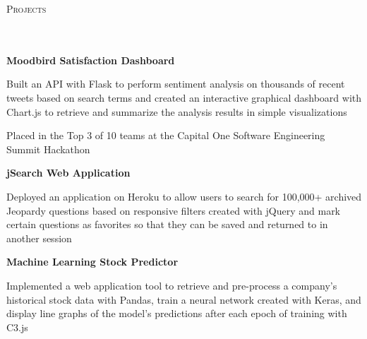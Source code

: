 \documentclass{article}
\newcommand{\header}[1]{{
\hspace*{-15pt}\vspace*{6pt} \large \scshape{#1}} \vspace*{-6pt} 
\lineunder
}
\newcommand{\lineunder}{
\vspace*{-8pt} \\ \hspace*{-18pt} 
\hrulefill \\
}
\newcommand{\project}[4]{{
\vspace*{2pt}%
\textbf{#1} #2 \hfill #3\\ #4 \vspace*{2pt}}
}
\renewcommand{\labelitemii}{
$\vcenter{\hbox{\tiny$\bullet$}}$\hspace*{-3pt}
}
\newenvironment{bullet-list-minor}{
\begin{list}{\labelitemii}{\setlength\leftmargin{15pt} 
\topsep 0pt \itemsep -2pt}}{\vspace*{4pt}\end{list}
}
\begin{document}
\medskip
\smallskip

\vspace*{4pt}%
\header{Projects}
    \vspace{4pt}
    \project{Moodbird Satisfaction Dashboard}{}{}{}
	\begin{bullet-list-minor} 
	\item Built an API with Flask to perform sentiment analysis on thousands of recent tweets based on search terms and created an interactive graphical dashboard with Chart.js to retrieve and summarize the analysis results in simple visualizations
	\item Placed in the Top 3 of 10 teams at the Capital One Software Engineering Summit Hackathon
    \end{bullet-list-minor}
    \smallskip
    \project{jSearch Web Application}{}{}{}
	\begin{bullet-list-minor}
	\item Deployed an application on Heroku to allow users to search for 100,000+ archived Jeopardy questions based on responsive filters created with jQuery and mark certain questions as favorites so that they can be saved and returned to in another session
    \end{bullet-list-minor}
    \smallskip    
    \project{Machine Learning Stock Predictor}{}{}{}
	\begin{bullet-list-minor}
	\item Implemented a web application tool to retrieve and pre-process a company's historical stock data with Pandas, train a neural network created with Keras, and display line graphs of the model's predictions after each epoch of training with C3.js
    \end{bullet-list-minor}
\end{document}

